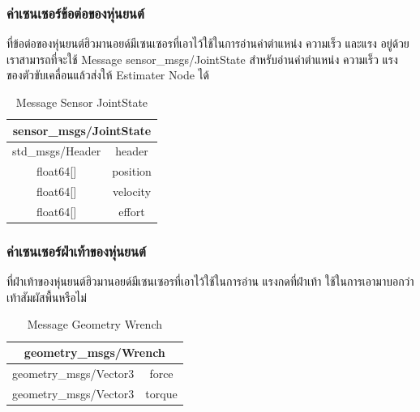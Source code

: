 \subsubsection*{ค่าเซนเซอร์ข้อต่อของหุ่นยนต์}
ที่ข้อต่อของหุ่นยนต์ฮิวมานอยด์มีเซนเซอรที่เอาไว้ใช้ในการอ่านค่าตำแหน่ง ความเร็ว และแรง อยู่ด้วย
เราสามารถที่จะใช้ Message sensor\_msgs/JointState สำหรับอ่านค่าตำแหน่ง ความเร็ว แรง
ของตัวขับเคลื่อนแล้วส่งให้ Estimater Node ได้
\begin{table}[!ht]
	\centering
	\begin{tabular}{| c | c |}
		\hline
		\multicolumn{2}{|c|}{sensor\_msgs/JointState}\\
		\hline
		std\_msgs/Header & header \\
		float64[] & position \\
		float64[] & velocity \\
		float64[] & effort \\
		\hline
	\end{tabular}
	\caption{Message Sensor JointState}
	\label{tab:sensor_jointstate}
\end{table}

\subsubsection*{ค่าเซนเซอร์ฝ่าเท้าของหุ่นยนต์}
ที่ฝ่าเท้าของหุ่นยนต์ฮิวมานอยด์มีเซนเซอรที่เอาไว้ใช้ในการอ่าน แรงกดที่ฝ่าเท้า ใช้ในการเอามาบอกว่าเท้าสัมผัสพื้นหรือไม่
\begin{table}[!ht]
	\centering
	\begin{tabular}{| c | c |}
		\hline
		\multicolumn{2}{|c|}{geometry\_msgs/Wrench}\\
		\hline
		geometry\_msgs/Vector3 & force \\
		geometry\_msgs/Vector3 & torque \\
		\hline
	\end{tabular}
	\caption{Message Geometry Wrench}
	\label{tab:geometry_wrench}
\end{table}

\clearpage
